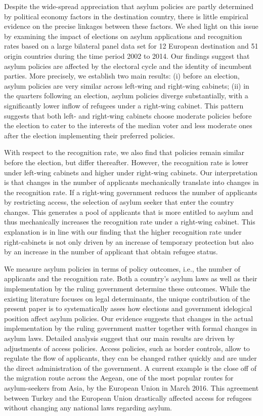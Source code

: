 \documentclass[a4paper,12pt]{article}
\begin{document}
Despite the wide-spread appreciation that asylum policies are partly determined by political economy factors in the destination country, there is little empirical evidence on the precise linkages between these factors. We shed light on this issue by examining the impact of elections on asylum applications and recognition rates based on a large bilateral panel data set for 12 European destination and 51 origin countries during the time period 2002 to 2014. Our findings suggest that asylum policies are affected by the electoral cycle and the identity of incumbent parties. More precisely, we establish two main results: (i) before an election, asylum policies are very similar across left-wing and right-wing cabinets; (ii)  in the quarters following an election, asylum policies diverge substantially, with a significantly lower inflow of refugees under a right-wing cabinet. This pattern suggests that both left- and right-wing cabinets choose moderate policies before the election to cater to the interests of the median voter and less moderate ones after the election implementing their preferred policies. 

With respect to the recognition rate, we also find that policies remain similar before the election, but differ thereafter. However, the recognition rate is lower under left-wing cabinets and higher under right-wing cabinets. Our interpretation is that changes in the number of applicants mechanically translate into changes in the recognition rate. If a right-wing government reduces the number of applicants by restricting access, the selection of asylum seeker that enter the country changes. This generates a pool of applicants that is more entitled to asylum and thus mechanically increases the recognition rate under a right-wing cabinet. This explanation is in line with our finding that the higher recognition rate under right-cabinets is not only driven by an increase of temporary protection but also by an increase in the number of applicant that obtain refugee status. 

We measure asylum policies in terms of policy outcomes, i.e., the number of applicants and the recognition rate. Both a country's asylum laws as well as their implementation by the ruling government determine these outcomes. While the existing literature focuses on legal determinants, the unique contribution of the present paper is to systematically asses how elections and government idelogical position affect asylum policies. Our evidence suggests that changes in the actual implementation by the ruling government matter together with formal changes in asylum laws. Detailed analysis suggest that our main results are driven by adjustments of access policies. Access policies, such as border controls, allow to regulate the flow of applicants, they can be changed rather quickly and are under the direct administration of the government. A current example is the close off of the migration route across the Aegean, one of the most popular routes for asylum-seekers from Asia, by the European Union in March 2016. This agreement between Turkey and the European Union drastically affected access for refugees without changing any national laws regarding asylum.
\end{document}
